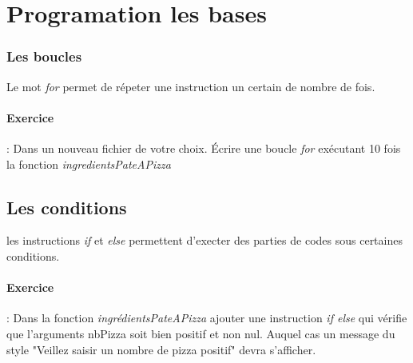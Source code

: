 \section{Programation les bases}

\subsubsection{Les boucles}

Le mot \emph{for} permet de répeter une instruction un certain de nombre de fois.

\paragraph{Exercice} : Dans un nouveau fichier de votre choix. Écrire une boucle \emph{for} exécutant 10 fois  la fonction \emph{ingredientsPateAPizza}

\subsection{Les conditions}
les instructions \emph{if} et \emph{else} permettent d'execter des parties de codes sous certaines conditions.

\paragraph{Exercice} : Dans la fonction \emph{ingrédientsPateAPizza} ajouter une instruction \emph{if else} qui vérifie que l'arguments nbPizza soit bien positif et non nul. Auquel cas un message du style "Veillez saisir un nombre de pizza positif" devra s'afficher.
 











